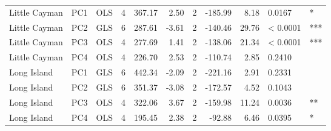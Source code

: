 \begin{table}[H]
\begin{tabular}{lllrrrrrrll}
        Little Cayman & PC1 & OLS & 4 & 367.17 & 2.50 & 2 & -185.99 & 8.18 & 0.0167 &  *\\
        Little Cayman & PC2 & GLS & 6 & 287.61 & -3.61 & 2 & -140.46 & 29.76 & < 0.0001 &  ***\\
        Little Cayman & PC3 & OLS & 4 & 277.69 & 1.41 & 2 & -138.06 & 21.34 & < 0.0001 &  ***\\
        Little Cayman & PC4 & OLS & 4 & 226.70 & 2.53 & 2 & -110.74 & 2.85 & 0.2410 &  \\
        Long Island & PC1 & GLS & 6 & 442.34 & -2.09 & 2 & -221.16 & 2.91 & 0.2331 &  \\
        Long Island & PC2 & GLS & 6 & 351.37 & -3.08 & 2 & -172.57 & 4.52 & 0.1043 &  \\
        Long Island & PC3 & OLS & 4 & 322.06 & 3.67 & 2 & -159.98 & 11.24 & 0.0036 &  **\\
        Long Island & PC4 & OLS & 4 & 195.45 & 2.38 & 2 & -92.88 & 6.46 & 0.0395 &  *\\
        \hline
    \end{tabular}
    \label{tab:anova}
\end{table}